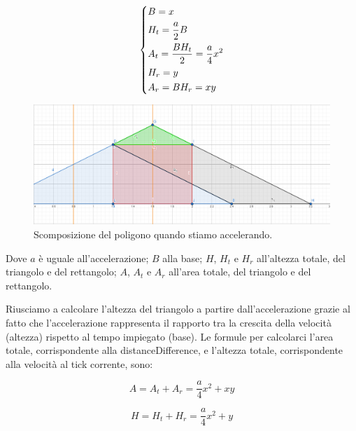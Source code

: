 \documentclass[main.tex]{subfiles}
\begin{document}
\begin{itemize}
    \begin{minipage}{.475\textwidth}
        \[
            \begin{dcases}
                B = x\\
                H_t = \frac{a}{2}B\\
                A_t = \frac{BH_t}{2} = \frac{a}{4}x^2\\
                H_r = y\\
                A_r = BH_r = xy
            \end{dcases}
        \]
    \end{minipage}
    \begin{minipage}{.475\textwidth}
        \begin{figure}[H]
            \centering
            \includegraphics[width=1\linewidth]{img/interpolazione/compensateLateCallAccel2.png}
            \captionsetup{justification=centering,margin=.3cm}
            \caption{Scomposizione del poligono quando stiamo accelerando.}
            \label{fig:4_compensateLateCallAccel2}
        \end{figure}
    \end{minipage}
    
    Dove $a$ è uguale all'accelerazione; $B$ alla base; $H$, $H_t$ e $H_r$ all'altezza totale, del triangolo e del rettangolo; $A$, $A_t$ e $A_r$ all'area totale, del triangolo e del rettangolo.
    
    Riusciamo a calcolare l'altezza del triangolo a partire dall'accelerazione grazie al fatto che l'accelerazione rappresenta il rapporto tra la crescita della velocità (altezza) rispetto al tempo impiegato (base).\newline
    Le formule per calcolarci l'area totale, corrispondente alla distanceDifference, e l'altezza totale, corrispondente alla velocità al tick corrente, sono:
    \hspace{2cm}
    
    \begin{minipage}{.45\textwidth}\[A = A_t + A_r = \frac{a}{4}x^2 + xy\]\end{minipage}
    \begin{minipage}{.45\textwidth}\[H = H_t + H_r = \frac{a}{4}x^2 + y\]\end{minipage}
    

\end{itemize}
\end{document}
